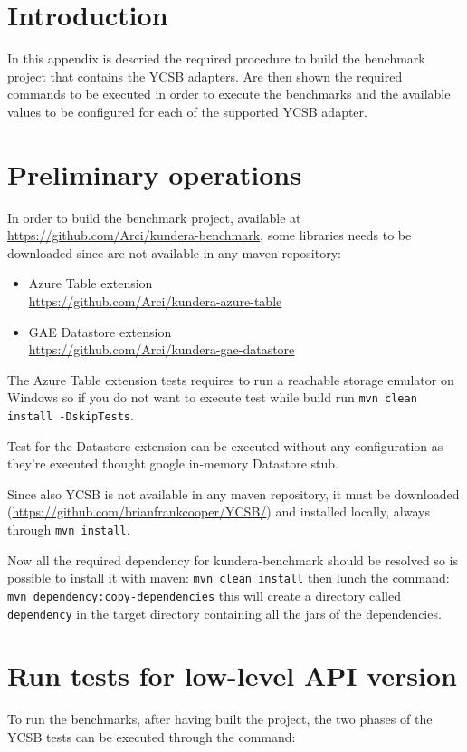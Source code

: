 \section{Introduction}
In this appendix is descried the required procedure to build the benchmark project that contains the YCSB adapters.
Are then shown the required commands to be executed in order to execute the benchmarks and the available values to be configured for each of the supported YCSB adapter.

\section{Preliminary operations}
In order to build the benchmark project, available at \url{https://github.com/Arci/kundera-benchmark}, some libraries needs to be downloaded since are not available in any maven repository:
\begin{itemize}
\item Azure Table extension\\ \url{https://github.com/Arci/kundera-azure-table}
\item GAE Datastore extension \\\url{https://github.com/Arci/kundera-gae-datastore}
\end{itemize}

\noindent The Azure Table extension tests requires to run a reachable storage emulator on Windows so if you do not want to execute test while build run \texttt{mvn clean install -DskipTests}.
 
\noindent Test for the Datastore extension can be executed without any configuration as they're executed thought google in-memory Datastore stub.

\noindent Since also YCSB is not available in any maven repository, it must be downloaded (\url{https://github.com/brianfrankcooper/YCSB/}) and installed locally, always through \texttt{mvn install}.

\newparagraph Now all the required dependency for kundera-benchmark should be resolved so is possible to install it with maven:
\texttt{mvn clean install}
then lunch the command:
\texttt{mvn dependency:copy-dependencies}
this will create a directory called \texttt{dependency} in the target directory containing all the jars of the dependencies.

\section{Run tests for low-level API version}
\label{appendix:ycsb-low-level}
To run the benchmarks, after having built the project, the two phases of the YCSB tests can be executed through the command:

